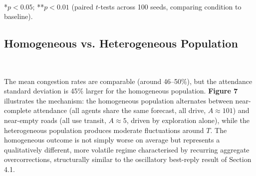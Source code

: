 \documentclass[letterpaper]{article}
\begin{document}
\begin{table}[H]
\centering
{} \\
\caption{Contribution of Novel Predictors (Ablation)}
\end{table}

*$p<0.05$; **$p<0.01$ (paired $t$-tests across 100 seeds, comparing condition to baseline).

\subsection{Homogeneous vs. Heterogeneous Population}

\begin{table}[H]
\centering
{} \\
\caption{Homogeneous vs Heterogeneous Population}
\end{table}

The mean congestion rates are comparable (around 46--50\%), but the attendance standard deviation is 45\% larger for the homogeneous population. \textbf{Figure 7} illustrates the mechanism: the homogeneous population alternates between near-complete attendance (all agents share the same forecast, all drive, $A \approx 101$) and near-empty roads (all use transit, $A \approx 5$, driven by exploration alone), while the heterogeneous population produces moderate fluctuations around $T$. The homogeneous outcome is not simply worse on average but represents a qualitatively different, more volatile regime characterised by recurring aggregate overcorrections, structurally similar to the oscillatory best-reply result of Section 4.1. \\
\end{document}
